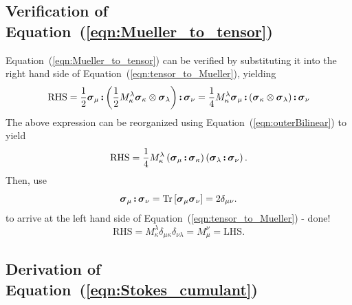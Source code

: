 \documentclass[twocolumn]{aastex6}
\newcommand{\mbf}[1]{\mbox{\boldmath $#1$}}
\newcommand{\Eqn}[1]{Equation~(\ref{eqn:#1})}
\newcommand{\irow}{\mu} \newcommand{\icol}{\nu}
\newcommand{\jrow}{\kappa} \newcommand{\jcol}{\lambda}
\newcommand{\trace}{{\rm Tr}}
\newcommand{\tr}[1]{\trace\ensuremath{ \left[ {#1} \right] }}
\newcommand{\outerBilinear}[2]{\ensuremath{{#1}\otimes{#2}}}
\newcommand{\dc}[2]{\ensuremath{{#1}\,\mbf{:}\,{#2}}}
\newcommand{\pauli}[1]{\ensuremath{\mbf{\sigma}_{#1}}}
\begin{document}
{\begin{appendix}
%
% 
%
\hrulefill
\subsection{Verification of \Eqn{Mueller_to_tensor}}

\noindent
\Eqn{Mueller_to_tensor} can be verified by substituting it into the
right hand side of \Eqn{tensor_to_Mueller}, yielding
\[
\mathrm{RHS}=
\frac{1}{2} \dc{\pauli{\irow}}{\dc{\left( \frac{1}{2} M_\jrow^\jcol \outerBilinear{\pauli{\jrow}}{\pauli{\jcol}} \right)}{\pauli{\icol}}}
=
\frac{1}{4} M_\jrow^\jcol \dc{\pauli{\irow}}{\dc{\left( \outerBilinear{\pauli{\jrow}}{\pauli{\jcol}} \right)}{\pauli{\icol}}}
\]
The above expression can be reorganized using \Eqn{outerBilinear} to yield
\[
\mathrm{RHS}=
\frac{1}{4} M_\jrow^\jcol \left(\dc{\pauli{\irow}}{\pauli{\jrow}}\right)\left(\dc{\pauli{\jcol}}{\pauli{\icol}} \right).
\]
Then, use
\[
\pauli{\irow}\,\mbf{:}\,\pauli{\icol}=\tr{\pauli{\irow}\pauli{\icol}}=2\delta_{\irow\icol}.
\]
to arrive at the left hand side of \Eqn{tensor_to_Mueller} - done!
\[
\mathrm{RHS}=
M_\jrow^\jcol \delta_{\irow\jrow} \delta_{\icol\jcol} = M_\irow^\icol = \mathrm{LHS}.
\]

%
% 
%

\hrulefill
\subsection{Derivation of \Eqn{Stokes_cumulant}}


\end{appendix}}
\end{document}
